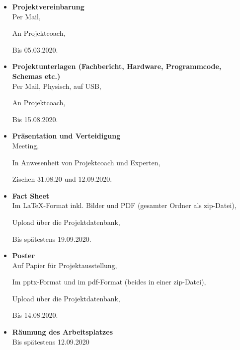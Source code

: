 \begin{itemize}

\item \textbf{Projektvereinbarung}\\

Per Mail,

An Projektcoach,

Bis 05.03.2020. \\

\item \textbf{Projektunterlagen (Fachbericht, Hardware, Programmcode, Schemas etc.)}\\

Per Mail, Physisch, auf USB,

An Projektcoach,

Bis 15.08.2020.\\

\item \textbf{Präsentation und Verteidigung}\\

Meeting,

In Anwesenheit von Projektcoach und Experten,

Zischen 31.08.20 und 12.09.2020.\\

\item \textbf{Fact Sheet}\\

Im LaTeX-Format inkl. Bilder und PDF (gesamter Ordner als zip-Datei),

Upload über die Projektdatenbank,

Bis spätestens 19.09.2020.\\

\item \textbf{Poster}\\

Auf Papier für Projektausstellung,

Im pptx-Format und im pdf-Format (beides in einer zip-Datei),

Upload über die Projektdatenbank,

Bis 14.08.2020.\\

\item \textbf{Räumung des Arbeitsplatzes}\\

Bis spätestens 12.09.2020


\end{itemize}	
